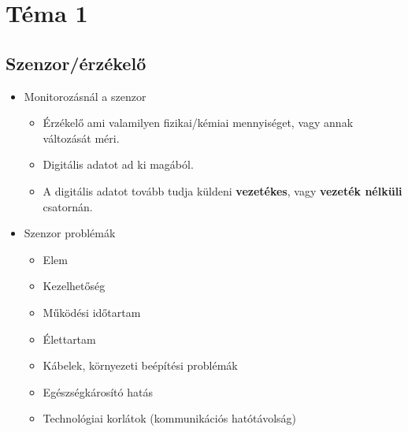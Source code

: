 ﻿\section{Téma 1}

\subsection{Szenzor/érzékelő}
\begin{itemize}
    \item Monitorozásnál a szenzor
    \begin{itemize}
        \item Érzékelő ami valamilyen fizikai/kémiai mennyiséget, vagy annak változását méri.
        \item Digitális adatot ad ki magából.
        \item A digitális adatot tovább tudja küldeni \textbf{vezetékes}, vagy \textbf{vezeték nélküli} csatornán.
    \end{itemize}
    \item Szenzor problémák
    \begin{itemize}
        \item Elem
        \item Kezelhetőség
        \item Működési időtartam
        \item Élettartam
        \item Kábelek, környezeti beépítési problémák
        \item Egészségkárosító hatás
        \item Technológiai korlátok (kommunikációs hatótávolság)
    \end{itemize}
\end{itemize}

